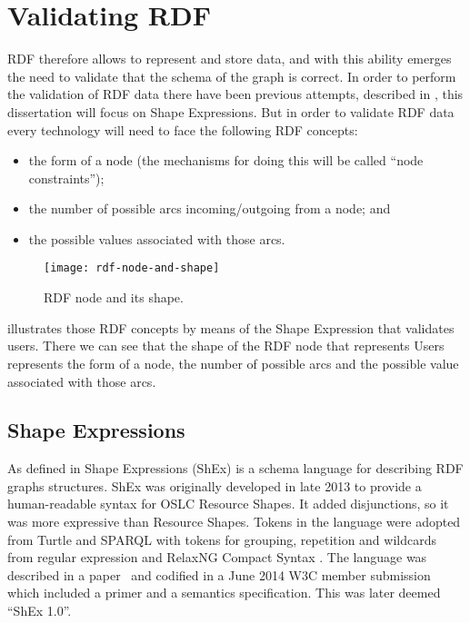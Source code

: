 \section{Validating RDF}
RDF therefore allows to represent and store data, and with this ability emerges the need to validate that the schema of the graph is correct. In order to perform the validation of RDF data there  have been previous attempts, described in , this dissertation will focus on Shape Expressions. But in order to validate RDF data every technology will need to face the following RDF concepts:

\begin{itemize}
 \item the form of a node (the mechanisms for doing this will be called “node constraints”);
 \item the number of possible arcs incoming/outgoing from a node; and
 \item the possible values associated with those arcs.
\end{itemize}

\begin{figure}[hb]
  \texttt{[image: rdf-node-and-shape]}
  \caption[RDF node and its shape]{RDF node and its shape.}
\end{figure}

 illustrates those RDF concepts by means of the Shape Expression that validates users. There we can see that the shape of the RDF node that represents Users represents the form of a node, the number of possible arcs and the possible value associated with those arcs.

\subsection{Shape Expressions}
As defined in  Shape Expressions (ShEx) is a schema language for describing RDF graphs structures. ShEx was originally developed in late 2013 to provide a human-readable syntax for OSLC Resource Shapes. It added disjunctions, so it was more expressive than Resource Shapes. Tokens in the language were adopted from Turtle and SPARQL with tokens for grouping, repetition and wildcards from regular expression and RelaxNG Compact Syntax . The language was described in a paper  and codified in a June 2014 W3C member submission which included a primer and a semantics specification. This was later deemed “ShEx 1.0”.

